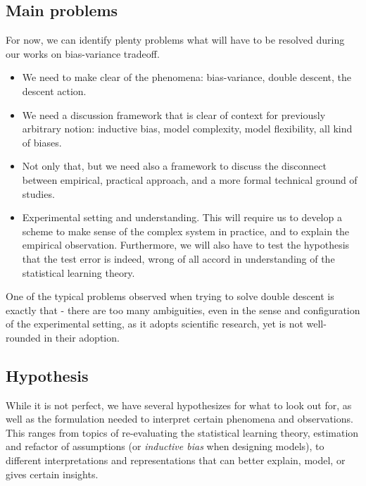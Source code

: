 \subsection{Main problems}
For now, we can identify plenty problems what will have to be resolved during our works on bias-variance tradeoff. 
\begin{itemize}[topsep=1pt,itemsep=0.5pt]
    \item We need to make clear of the phenomena: bias-variance, double descent, the descent action. 
    \item We need a discussion framework that is clear of context for previously arbitrary notion: inductive bias, model complexity, model flexibility, all kind of biases. 
    \item Not only that, but we need also a framework to discuss the disconnect between empirical, practical approach, and a more formal technical ground of studies. 
    \item Experimental setting and understanding. This will require us to develop a scheme to make sense of the complex system in practice, and to explain the empirical observation. Furthermore, we will also have to test the hypothesis that the test error is indeed, wrong of all accord in understanding of the statistical learning theory. 
\end{itemize}
One of the typical problems observed when trying to solve double descent is exactly that - there are too many ambiguities, even in the sense and configuration of the experimental setting, as it adopts scientific research, yet is not well-rounded in their adoption. 
\subsection{Hypothesis}
While it is not perfect, we have several hypothesizes for what to look out for, as well as the formulation needed to interpret certain phenomena and observations. This ranges from topics of re-evaluating the statistical learning theory, estimation and refactor of assumptions (or \textit{inductive bias} when designing models), to different interpretations and representations that can better explain, model, or gives certain insights.  

